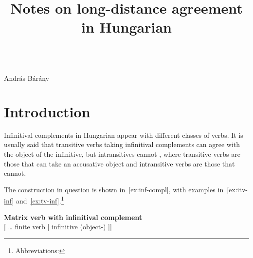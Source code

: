


\usepackage{enumitem}


\title{Notes on long-distance agreement in Hungarian}




\thispagestyle{plain}
\\[.2cm]
\noindent\textsf{András Bárány}

\section{Introduction}\label{sec:introduction}

Infinitival complements in Hungarian appear with different classes of verbs. It
is usually said that transitive verbs taking infinitival complements can agree
with the object of the infinitive, but intransitives cannot
\parencite{EKiss1987,EKiss1989,KalmanCetal1989,KenVagFeny1998,EKiss2002,EKissvanRie2004b,denDikken2004,Coppock2012d,Szecsenyi2017,SzeSze2018},
where transitive verbs are those that can take an accusative object and
intransitive verbs are those that cannot.

The construction in question is shown in~\eqref{ex:inf-compl}, with examples
in~\eqref{ex:itv-inf} and~\eqref{ex:tv-inf}.\footnote{Abbreviations:
\printglosses}

\ex\label{ex:inf-compl}\textbf{Matrix verb with infinitival complement}\\
    {}[ \dots{} finite verb [\tss{\Inf} infinitive (object-\Acc{}) ]]
\xe


